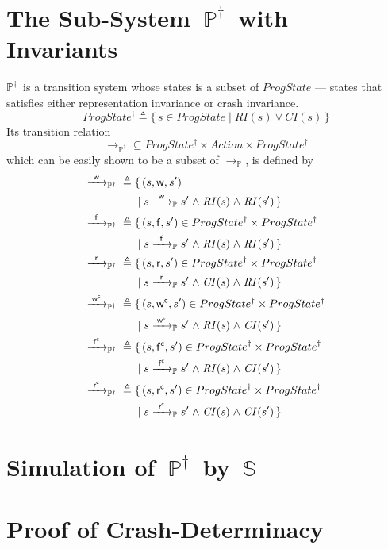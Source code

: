 \documentclass[letterpaper,twocolumn,10pt]{article}
\theoremstyle{definition}
\newcommand{\defeq}{{}\triangleq{}}
\newcommand{\conj}{\mathrel\land}
\newcommand{\awa}[2]{\hphantom{#1}\mathclap{#2}\hphantom{#1}} %
\renewcommand{\i}[1]{\ensuremath{\mathit{#1}}}
\newcommand{\Spec}{\ensuremath{\mathbb S}}
\newcommand{\Prog}{\ensuremath{\mathbb P}}
\newcommand{\ProgInv}{\ensuremath{\mathbb P^\dagger}}
\newcommand{\actw}{\mathsf w}
\newcommand{\actwc}{\mathsf w^\mathsf{c}}
\newcommand{\actf}{\mathsf f}
\newcommand{\actr}{\mathsf r}
\newcommand{\actfc}{\mathsf{f^c}}
\newcommand{\actrc}{\mathsf{r^c}}
\newcommand{\ttIn}[2]{\xrightarrow{#1}_{#2}}
\newcommand{\ttP}[1]{\ttIn{#1}{\Prog}}
\newcommand{\ttPI}[1]{\ttIn{#1}{\ProgInv}}
\begin{document}
\section{The Sub-System~\ProgInv\ with Invariants}
\label{sec:ProgInv}
\ProgInv\ is a transition system whose states is a subset of \i{ProgState} \---- states that satisfies either representation invariance or crash invariance. 
$$\i{ProgState^{\dagger}} \defeq{} \{\, s \in \i{ProgState} \mid \i{RI(s) \lor CI(s)} \,\}$$
Its transition relation 
$$\ttPI{} \subseteq \i{ProgState^\dagger} \times \i{Action} \times \i{ProgState^\dagger}$$
which can be easily shown to be a subset of \i{\ttP{}}, is defined by
\begin{align*}
	\ttPI{\awa{w}\actw} \defeq{}& \{\, (s, \actw, s') \\
	&\mid s \ttP{\awa{w}\actw} s' \conj \i{RI(s)} \conj \i{RI(s')} \,\} \\
	\ttPI{\awa{w}\actf} \defeq{}& \{\, (s, \actf, s') \in ProgState^\dagger \times ProgState^\dagger\\ &\mid s \ttP{\awa{w}\actf} s' \conj \i{RI(s)} \conj \i{RI(s')} \,\} \\
	\ttPI{\awa{w}\actr} \defeq{}& \{\, (s, \actr, s') \in ProgState^\dagger \times ProgState^\dagger\\ &\mid s \ttP{\awa{w}\actr} s' \conj \i{CI(s)} \conj \i{RI(s')} \,\} \\
	\ttPI{\awa{w}\actwc} \defeq{}& \{\, (s, \actwc, s') \in ProgState^\dagger \times ProgState^\dagger\\ &\mid s \ttP{\awa{w}\actwc} s' \conj \i{RI(s)} \conj \i{CI(s')} \,\} \\
	\ttPI{\awa{w}\actfc} \defeq{}& \{\, (s, \actfc, s') \in ProgState^\dagger \times ProgState^\dagger\\ &\mid s \ttP{\awa{w}\actfc} s' \conj \i{RI(s)} \conj \i{CI(s')} \,\} \\
	\ttPI{\awa{w}\actrc} \defeq{}& \{\, (s, \actrc, s') \in ProgState^\dagger \times ProgState^\dagger\\ &\mid s \ttP{\awa{w}\actrc} s' \conj \i{CI(s)} \conj \i{CI(s')} \,\} 
\end{align*}


\section{Simulation of~\ProgInv\ by~\Spec}
\label{sec:sim}



\section{Proof of Crash-Determinacy}
\label{sec:proof}
\end{document}
